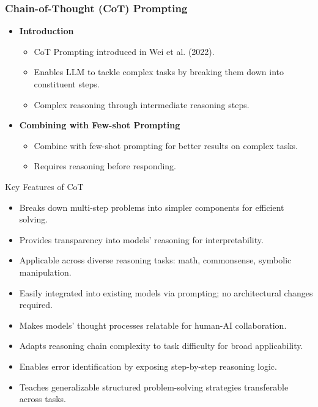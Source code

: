\begin{frame}[fragile]\frametitle{Chain-of-Thought (CoT) Prompting}

\begin{itemize}
  \item \textbf{Introduction}
    \begin{itemize}
      \item CoT Prompting introduced in Wei et al. (2022).
      \item Enables LLM to tackle complex tasks by breaking them down into constituent steps.
      \item Complex reasoning through intermediate reasoning steps.
    \end{itemize}

  \item \textbf{Combining with Few-shot Prompting}
    \begin{itemize}
      \item Combine with few-shot prompting for better results on complex tasks.
      \item Requires reasoning before responding.
    \end{itemize}

\end{itemize}

\end{frame}

\begin{frame}[fragile]{Key Features of CoT}
    \begin{itemize}
        \item Breaks down multi-step problems into simpler components for efficient solving.
        \item Provides transparency into models' reasoning for interpretability.
        \item Applicable across diverse reasoning tasks: math, commonsense, symbolic manipulation.
        \item Easily integrated into existing models via prompting; no architectural changes required.
        \item Makes models' thought processes relatable for human-AI collaboration.
        \item Adapts reasoning chain complexity to task difficulty for broad applicability.
        \item Enables error identification by exposing step-by-step reasoning logic.
        \item Teaches generalizable structured problem-solving strategies transferable across tasks.
    \end{itemize}
\end{frame}



